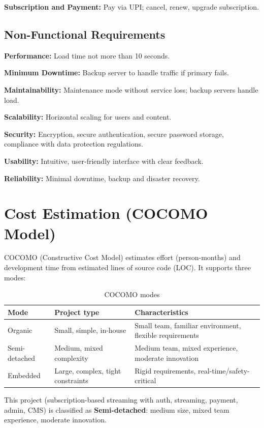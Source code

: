 \documentclass[12pt,a4paper]{article}
\newcommand{\sdlcsubsection}[1]{%
  \needspace{7\baselineskip}%
  \subsection*{\fontsize{14pt}{1.2}\selectfont #1}%
  \nopagebreak
}
\begin{document}
\textbf{Subscription and Payment:} Pay via UPI; cancel, renew, upgrade subscription.

\sdlcsubsection{Non-Functional Requirements}

\textbf{Performance:} Load time not more than 10 seconds.

\textbf{Minimum Downtime:} Backup server to handle traffic if primary fails.

\textbf{Maintainability:} Maintenance mode without service loss; backup servers handle load.

\textbf{Scalability:} Horizontal scaling for users and content.

\textbf{Security:} Encryption, secure authentication, secure password storage, compliance with data protection regulations.

\textbf{Usability:} Intuitive, user-friendly interface with clear feedback.

\textbf{Reliability:} Minimal downtime, backup and disaster recovery.

\section*{\fontsize{14pt}{1.2}\selectfont Cost Estimation (COCOMO Model)}

\fontsize{12pt}{1.2}\selectfont

COCOMO (Constructive Cost Model) estimates effort (person-months) and development time from estimated lines of source code (LOC). It supports three modes:

\begin{table}[htbp]
  \centering
  \caption{COCOMO modes}
  \begin{tabular}{@{}lll@{}}
    \toprule
    \textbf{Mode} & \textbf{Project type}             & \textbf{Characteristics}                                \\
    \midrule
    Organic       & Small, simple, in-house           & Small team, familiar environment, flexible requirements \\
    Semi-detached & Medium, mixed complexity          & Medium team, mixed experience, moderate innovation      \\
    Embedded      & Large, complex, tight constraints & Rigid requirements, real-time/safety-critical           \\
    \bottomrule
  \end{tabular}
\end{table}

This project (subscription-based streaming with auth, streaming, payment, admin, CMS) is classified as \textbf{Semi-detached}: medium size, mixed team experience, moderate innovation.
\end{document}
